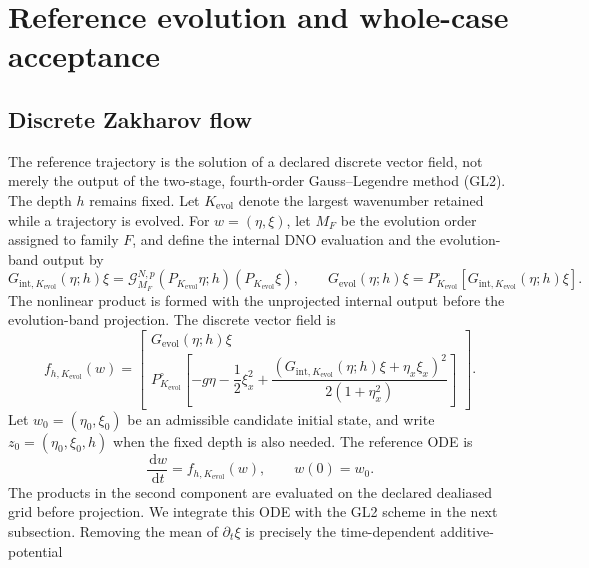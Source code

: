\documentclass[11pt]{article}
\newcommand{\G}{\mathcal G}
\newcommand{\dd}{\,\mathrm d}
\begin{document}
\section{Reference evolution and whole-case acceptance}
\label{sec:acceptance}

\subsection{Discrete Zakharov flow}

The reference trajectory is the solution of a declared discrete vector field,
not merely the output of the two-stage, fourth-order Gauss--Legendre method
(GL2).  The depth $h$ remains fixed.  Let $K_{\mathrm{evol}}$ denote the
largest wavenumber retained while a trajectory is evolved.  For
$w=(\eta,\xi)$, let \(M_F\) be the evolution order assigned to family \(F\),
and define the internal DNO evaluation and the evolution-band output by
\begin{equation}
  G_{\mathrm{int},K_{\mathrm{evol}}}(\eta;h)\xi
  =\G^{N,p}_{M_F}(P_{K_{\mathrm{evol}}}\eta;h)
     (P_{K_{\mathrm{evol}}}\xi),
  \qquad
  G_{\mathrm{evol}}(\eta;h)\xi
  =P_{K_{\mathrm{evol}}}^\circ\!\left[
    G_{\mathrm{int},K_{\mathrm{evol}}}(\eta;h)\xi\right].
  \label{eq:internal-and-delivered-dno}
\end{equation}
The nonlinear product is formed with the unprojected internal output before
the evolution-band projection.  The discrete vector field is
\begin{equation}
  f_{h,K_{\mathrm{evol}}}(w)=
  \begin{bmatrix}
    G_{\mathrm{evol}}(\eta;h)\xi\\[2pt]
    P_{K_{\mathrm{evol}}}^\circ\!\left[
      -g\eta-\dfrac12\xi_x^2
      +\dfrac{\left(
        G_{\mathrm{int},K_{\mathrm{evol}}}(\eta;h)\xi
        +\eta_x\xi_x\right)^2}
             {2(1+\eta_x^2)}
    \right]
  \end{bmatrix}.
\end{equation}
Let $w_0=(\eta_0,\xi_0)$ be an admissible candidate initial state, and write
$z_0=(\eta_0,\xi_0,h)$ when the fixed depth is also needed.  The reference
ODE is
\begin{equation}
  \frac{\dd w}{\dd t}=f_{h,K_{\mathrm{evol}}}(w),
  \qquad w(0)=w_0.
  \label{eq:reference-flow}
\end{equation}
The products in the second component are evaluated on the declared dealiased
grid before projection.
We integrate this ODE with the GL2 scheme in the next subsection.
Removing the mean of $\partial_t\xi$ is precisely the time-dependent additive-potential
\end{document}
